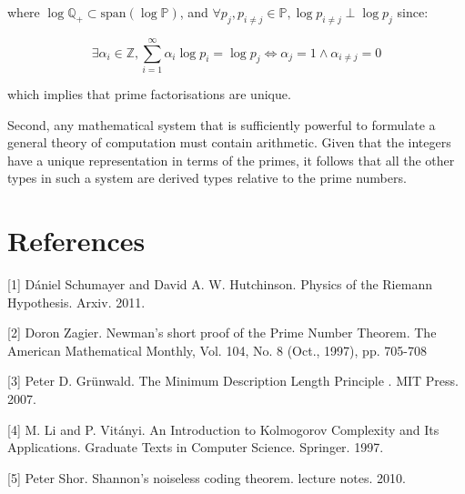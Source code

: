 \documentclass{article}
\begin{document}
where $\log \mathbb{Q_+} \subset \text{span}(\log \mathbb{P})$, and $\forall p_j, p_{i \neq j} \in \mathbb{P}, \log p_{i \neq j} \perp \log p_j$ since:

\begin{equation}
\exists \alpha_i \in \mathbb{Z}, \sum_{i=1}^\infty \alpha_i \log p_i = \log p_j \iff \alpha_j = 1 \land \alpha_{i \neq j} = 0
\end{equation}

which implies that prime factorisations are unique.

Second, any mathematical system that is sufficiently powerful to formulate a general theory of computation must contain
arithmetic. Given that the integers have a unique representation in terms of the primes, it follows that all the other types in
such a system are derived types relative to the prime numbers.

\section*{References}

\small

[1] Dániel Schumayer and David A. W. Hutchinson. Physics of the Riemann Hypothesis. Arxiv. 2011.

[2] Doron Zagier. Newman's short proof of the Prime Number Theorem. The American Mathematical Monthly, Vol. 104, No. 8 (Oct., 1997), pp. 705-708

[3] Peter D. Grünwald. The Minimum Description Length Principle
. MIT Press. 2007.

[4] M. Li and P. Vitányi. An Introduction to Kolmogorov Complexity and Its Applications. Graduate Texts in Computer Science. Springer. 1997.

[5] Peter Shor. Shannon’s noiseless coding theorem. lecture notes. 2010.
\end{document}
